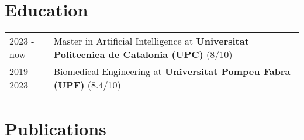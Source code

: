 \documentclass[a4paper,12pt]{article}
\begin{document}
\section{Education}
\begin{tabularx}{\linewidth}{@{}l X@{}}	
2023 - now & Master in Artificial Intelligence at \textbf{Universitat Politecnica de Catalonia (UPC)} \hfill \normalsize (8/10) \\

2019 - 2023 & Biomedical Engineering at \textbf{Universitat Pompeu Fabra (UPF)} \hfill (8.4/10) \\ 
\end{tabularx}

\section{Publications}
\begin{refsection}
\nocite{UTI2024}
\nocite{honey2023}
\nocite{wine2022}
\printbibliography[heading=none]
\end{refsection}

\vfill
{}
\end{document}
